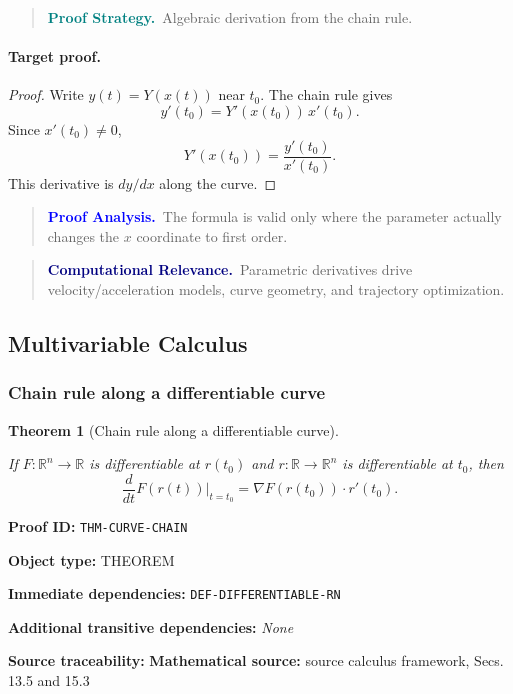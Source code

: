 \documentclass[10pt]{article}
\newcommand{\pidraw}[1]{\begingroup\urlstyle{tt}\nolinkurl{#1}\endgroup}
\newtheorem{theorem}{Theorem}[section]
\theoremstyle{definition}
\theoremstyle{remark}
\newenvironment{proofstrategy}
{\begin{quote}\small\noindent\textbf{\textcolor{teal}{Proof Strategy.}}\ }
{\end{quote}}
\newenvironment{proofanalysis}
{\begin{quote}\small\noindent\textbf{\textcolor{blue}{Proof Analysis.}}\ }
{\end{quote}}
\newenvironment{computationalrelevance}
{\begin{quote}\small\noindent\textbf{\textcolor{navy}{Computational Relevance.}}\ }
{\end{quote}}
\newcommand{\meta}[2]{\noindent\textbf{#1:} #2\par}
\begin{document}
\begin{proofstrategy}Algebraic derivation from the chain rule.\end{proofstrategy}

\paragraph{Target proof.}

\begin{proof}

Write $y(t)=Y(x(t))$ near $t_0$. The chain rule gives
\[
y'(t_0)=Y'(x(t_0))\,x'(t_0).
\]
Since $x'(t_0)\ne0$,
\[
Y'(x(t_0))=\frac{y'(t_0)}{x'(t_0)}.
\]
This derivative is $dy/dx$ along the curve.

\end{proof}

\begin{proofanalysis}The formula is valid only where the parameter actually changes the $x$ coordinate to first order.\end{proofanalysis}

\begin{computationalrelevance}Parametric derivatives drive velocity/acceleration models, curve geometry, and trajectory optimization.\end{computationalrelevance}

\subsection{Multivariable Calculus}

\subsubsection{Chain rule along a differentiable curve}

\begin{theorem}[Chain rule along a differentiable curve]\label{prf:THM-CURVE-CHAIN}

If $F:\mathbb{R}^n\to\mathbb{R}$ is differentiable at $r(t_0)$ and
$r:\mathbb{R}\to\mathbb{R}^n$ is differentiable at $t_0$, then
\[
\frac{d}{dt}F(r(t))\Big|_{t=t_0}
=
\nabla F(r(t_0))\cdot r'(t_0).
\]

\end{theorem}

\meta{Proof ID}{\pidraw{THM-CURVE-CHAIN}}
\meta{Object type}{THEOREM}
\meta{Immediate dependencies}{\pidraw{DEF-DIFFERENTIABLE-RN}}
\meta{Additional transitive dependencies}{\emph{None}}
\meta{Source traceability}{\textbf{Mathematical source:} source calculus framework, Secs. 13.5 and 15.3}
\end{document}
